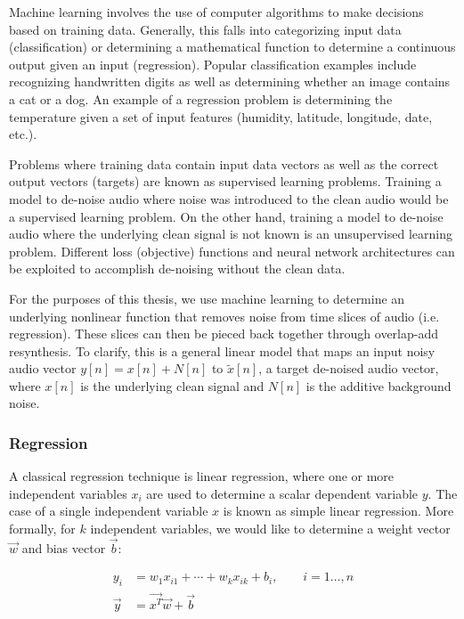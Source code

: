 Machine learning involves the use of computer algorithms to make decisions based on training data. Generally, this falls into categorizing input data (classification) or determining a mathematical function to determine a continuous output given an input (regression). Popular classification examples include recognizing handwritten digits as well as determining whether an image contains a cat or a dog. An example of a regression problem is determining the temperature given a set of input features (humidity, latitude, longitude, date, etc.).

Problems where training data contain input data vectors as well as the correct output vectors (targets) are known as supervised learning problems. Training a model to de-noise audio where noise was introduced to the clean audio would be a supervised learning problem. On the other hand, training a model to de-noise audio where the underlying clean signal is not known is an unsupervised learning problem. Different loss (objective) functions and neural network architectures can be exploited to accomplish de-noising without the clean data.

For the purposes of this thesis, we use machine learning to determine an underlying nonlinear function that removes noise from time slices of audio (i.e. regression). These slices can then be pieced back together through overlap-add resynthesis. To clarify, this is a general linear model that maps an input noisy audio vector $y[n]=x[n]+N[n]$ to $\tilde{x}[n]$, a target de-noised audio vector, where $x[n]$ is the underlying clean signal and $N[n]$ is the additive background noise.

\subsubsection{Regression}
A classical regression technique is linear regression, where one or more independent variables $x_{i}$ are used to determine a scalar dependent variable $y$. The case of a single independent variable $x$ is known as simple linear regression. More formally, for $k$ independent variables, we would like to determine a weight vector $\vec{w}$ and bias vector $\vec{b}$:

\begin{align}
y_i &= w_{1}x_{i1} + \cdots + w_{k}x_{ik} + b_{i}, \qquad i=1\ldots ,n \\
\vec{y} &= \vec{x^T}\vec{w} + \vec{b}
\end{align}

